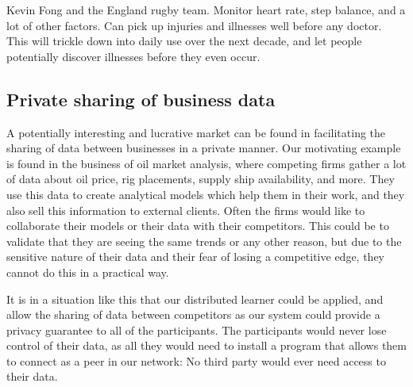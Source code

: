 Kevin Fong and the England rugby team. Monitor heart rate, step balance, and a lot of other factors. Can pick up injuries and illnesses well before any doctor. This will trickle down into daily use over the next decade, and let people potentially discover illnesses before they even occur. 

\subsection{Private sharing of business data}
A potentially interesting and lucrative market can be found in facilitating the sharing of data between businesses in a private manner. Our motivating example is found in the business of oil market analysis, where competing firms gather a lot of data about oil price, rig placements, supply ship availability, and more. They use this data to create analytical models which help them in their work, and they also sell this information to external clients. Often the firms would like to collaborate their models or their data with their competitors. This could be to validate that they are seeing the same trends or any other reason, but due to the sensitive nature of their data and their fear of losing a competitive edge, they cannot do this in a practical way. 

It is in a situation like this that our distributed learner could be applied, and allow the sharing of data between competitors as our system could provide a privacy guarantee to all of the participants. The participants would never lose control of their data, as all they would need to install a program that allows them to connect as a peer in our network: No third party would ever need access to their data.  



\cleardoublepage 